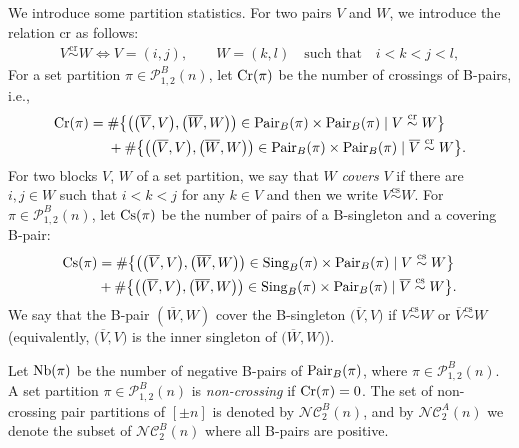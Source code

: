 \documentclass[11pt]{article}
\numberwithin{equation}{section}
\numberwithin{equation}{section}
\def\P{\mathcal{P}}
\def\NC{\mathcal{NC}}
\def\Cr{\text{\normalfont Cr}}
\def\InS{\text{\normalfont Cs}}
\def\NB{\text{\normalfont Nb}}
\def\Pair{\text{\normalfont Pair}}
\def\Sing{\text{\normalfont Sing}}
\begin{document}
We introduce some partition statistics.
For two pairs $V$ and $ W$, we introduce the relation $\text{cr}$ as follows:
\begin{gather*}
V\stackrel{\text{cr}}{\sim}W \iff
V=(i,j),\qquad W=(k,l)\quad \text{such that}\quad i<k<j<l,
\end{gather*}
For a set partition $\pi\in \P_{1,2}^{B}(n)$, let $\Cr(\pi)$ be the number of crossings of B-pairs, i.e.,
\begin{align*}
\Cr(\pi)={}&\#\big\{\big(\big(\overline{V}, V \big),\big(\overline{ W}, W\big)\big)\in \Pair_B(\pi)\times \Pair_B(\pi) \mid \text{$V\stackrel{\text{cr}}{\sim}W $}\big\}
\\
&+\#\big\{\big(\big(\overline{V}, V\big),\big(\overline{ W}, W\big)\big)\in \Pair_B(\pi)\times \Pair_B(\pi) \mid \text{$\overline{V}\stackrel{\text{cr}}{\sim}W $}\big\}.
\end{align*}
For two blocks $V$, $W$ of a set partition, we say that $W$ \emph{covers} $V$ if there are $i,j \in W$ such that $i <k <j$ for any $k\in V$ and then we write $V\stackrel{\text{cs}}{\sim}W $. For $\pi\in\P_{1,2}^{B}(n)$, let $\InS(\pi)$
be the number of pairs of a B-singleton and a covering B-pair:
\begin{align*}
\begin{split}
\InS(\pi)&=\#\big\{\big(\big(\overline{ V}, V \big),\big(\overline{ W}, W\big)
\big) \in \Sing_B(\pi) \times \Pair_B(\pi) \mid V\stackrel{\text{cs}}{\sim}W
\big\}
\\
 & +\#\big\{\big(\big(\overline{V}, V \big),\big(\overline{W}, W\big)\big) \in \Sing_B(\pi) \times \Pair_B(\pi) \mid \overline{V}\stackrel{\text{cs}}{\sim}W\big\}.
 \end{split}
\end{align*}
We say that the B-pair $(\overline{ W} , W)$ cover the B-singleton $\big(\overline{V}, V\big)$ if $V\stackrel{\text{cs}}{\sim}{W} $ or $\overline{V}\stackrel{\text{cs}}{\sim}{ W} $ (equivalently, $\big(\overline{V}, V\big)$ is the inner singleton of $\big(\overline{W} , W\big)$).

Let $\NB(\pi)$ be the number of negative B-pairs of $\Pair_B(\pi)$, where $\pi \in \P_{1,2}^{B}(n)$.
A set partition $\pi \in \P_{1,2}^{B}(n)$ is \emph{non-crossing} if $\Cr(\pi)=0$. The set of non-crossing pair partitions of $[\pm n]$ is denoted by $\NC^B_2(n)$, and by $\NC^A_2(n)$ we denote the subset of $\NC^B_2(n)$ where all B-pairs are positive.
\end{document}
